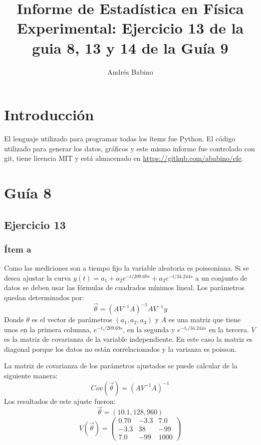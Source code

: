 \title{Informe de Estadística en Física Experimental: Ejercicio 13 de la guia 8,  13 y 14 de la  Guía 9}
\author{Andrés Babino}


\maketitle
\section{Introducción}
El lenguaje utilizado para programar todas los ítems fue Python.
El código utilizado para generar los datos, gráficos y este mismo informe fue controlado con git, tiene licencia MIT y está almacenado en \url{https://github.com/ababino/efe}.

\section*{Guía 8}
\subsection*{Ejercicio 13}
\subsubsection*{Ítem a}
Como las mediciones son a tiempo fijo la variable aleatoria es poissoniana.
Si se desea ajustar la curva $y(t) = a_1 + a_2 e^{-t/209.69s} + a_3 e^{-t/34.244s}$ a un conjunto de datos se deben usar las fórmulas de cuadrados mínimos lineal.
Los parámetros quedan determinados por:
$$
\vec{\theta} = {(AV^{-1}A)}^{-1}AV^{-1}y
$$
Donde $\theta$ es el vector de parámetros $(a_1, a_2, a_3)$ y $A$ es una matriz que tiene unos en la primera columna, $e^{-t_i/209.69s}$, en la segunda y $e^{-t_i/34.244s}$ en la tercera.
$V$ es la matriz de covarianza de la variable independiente.
En este caso la matriz es diagonal porque los datos no están correlacionados y la varianza es poisson.

La matriz de covarianza de los parámetros ajustados se puede calcular de la siguiente manera:
$$
Cov(\vec{\theta}) = {(AV^{-1}A)}^{-1}
$$
Los resultados de este ajuste fueron:
$$
\vec{\theta} = (10.1, 128, 960)
$$
$$
V(\vec{\theta}) =\left(
\begin{matrix}
0.70 &-3.3 & 7.0 \\
-3.3 & 38 &-99 \\
7.0  & -99 & 1000
\end{matrix} \right)
$$


